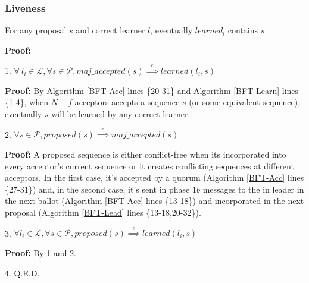 \subsubsection{Liveness}
\begin{Theorem}
For any proposal $s$ and correct learner $l$, eventually $learned_l$ contains $s$ \label{L-T1} \par
\end{Theorem} 
\parbox{\linewidth}{\textbf{Proof:}} \par
\parbox{\linewidth}{\strut1. $\forall\ l_i \in \mathcal{L},\forall s \in \mathcal{P}, maj\_accepted(s) \overset{e}{\implies} learned(l_i,s)$}\par
\indent\indent\parbox{\linewidth}{\strut\textbf{Proof:} By Algorithm \ref{BFT-Acc} lines \{20-31\} and Algorithm \ref{BFT-Learn} lines \{1-4\}, when $N-f$ acceptors accepts a sequence $s$ (or some equivalent sequence), eventually $s$ will be learned by any correct learner.}\par
\parbox{\linewidth}{\strut2. $\forall s \in \mathcal{P}, proposed(s) \overset{e}{\implies} maj\_accepted(s)$} \par
\indent\indent\parbox{\linewidth}{\strut\textbf{Proof:} A proposed sequence is either conflict-free when its incorporated into every acceptor's current sequence or it creates conflicting sequences at different acceptors. In the first case, it's accepted by a quorum (Algorithm \ref{BFT-Acc} lines \{27-31\}) and, in the second case, it's sent in phase $1b$ messages to the in leader in the next ballot (Algorithm \ref{BFT-Acc} lines \{13-18\}) and incorporated in the next proposal (Algorithm \ref{BFT-Lead} lines \{13-18,20-32\}).} \par
\parbox{\linewidth}{\strut3. $\forall l_i \in \mathcal{L}, \forall s \in \mathcal{P}, proposed(s) \overset{e}{\implies} learned(l_i,s)$} \par
\indent\indent\parbox{\linewidth}{\strut\textbf{Proof:} By 1 and 2.} \par
\parbox{\linewidth}{\strut4. Q.E.D.}